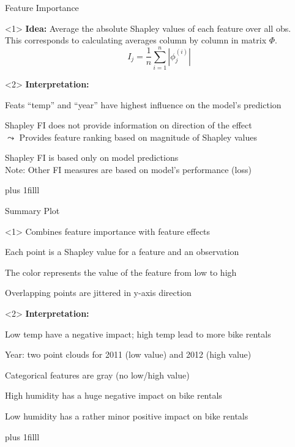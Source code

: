 \documentclass[10pt,compress,t,notes=noshow, xcolor=table]{beamer}
\newcommand{\btVFill}{\vskip0pt plus 1filll}
\begin{document}
\begin{framev}[align=top]{Feature Importance}
\begin{onlyenv}<1>
\textbf{Idea:} Average the absolute Shapley values of each feature over all obs.\\
This corresponds to calculating averages column by column in matrix $\Phi$.
$$
I_j = \frac{1}{n} \sum_{i=1}^{n} |\phi_j^{(i)}|
$$
\end{onlyenv}
\begin{onlyenv}<2>
\textbf{Interpretation:}
\begin{itemizeM}
\item Feats \enquote{temp} and \enquote{year} have highest influence on the model's prediction
\item Shapley FI does not provide information on direction of the effect\\
$\leadsto$ Provides feature ranking based on magnitude of Shapley values %
\item Shapley FI is based only on model predictions\\
Note: Other FI measures are based on model's performance (loss)
\end{itemizeM}
\end{onlyenv}
\btVFill
{}
\end{framev}


\begin{framev}[align=top]{Summary Plot}
\begin{onlyenv}<1>
Combines feature importance with feature effects
\begin{itemizeM}
\item Each point is a Shapley value for a feature and an observation
\item The color represents the value of the feature from low to high
\item Overlapping points are jittered in y-axis direction
\end{itemizeM}
\end{onlyenv}
\begin{onlyenv}<2>
\textbf{Interpretation:}\\
\begin{itemizeM}
\item Low temp have a negative impact; high temp lead to more bike rentals
\item Year: two point clouds for 2011 (low value) and 2012 (high value)\\
\item Categorical features are gray (no low/high value)
\item High humidity has a huge negative impact on bike rentals
\item Low humidity has a rather minor positive impact on bike rentals
\end{itemizeM}
\end{onlyenv}
\btVFill
{}
\end{framev}
\end{document}
